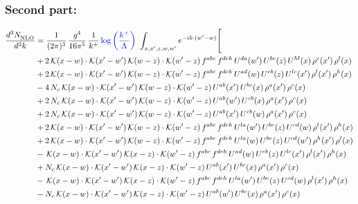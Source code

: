 \documentclass[9pt]{article}
\numberwithin{equation}{section}
\begin{document}
\subsubsection{Second part:}
\begin{align}
\frac{d^{3}N_{\rm NLO}^{\rm}}{d^{3}k}  & = \frac{1}{(2\pi)^{3}}\,\frac{g^{4}}{16\pi^{5}}\,\frac{1}{k^{+}}\,{\color{blue}\log{\left(\frac{k^{+}}{\Lambda}\right)}}\,\,\int_{x,x',z,w,w'}e^{-ik\cdot(w'-w)}\Bigg[\notag\\ &+2\,\mathcal{K}(x-w)\cdot\mathcal{K}(x'-w')\,\mathcal{K}(w-z)\cdot\mathcal{K}(w'-z)\,f^{abc}\,f^{deh}\,U^{da}(w')\,U^{be}(z)\,U^{hl}(x)\,\rho^{c}(x')\,\rho^{l}(x)\notag\\
&+2\,\mathcal{K}(x-w)\cdot\mathcal{K}(x'-w')\,\mathcal{K}(w-z)\cdot\mathcal{K}(w'-z)\,f^{abc}\,f^{deh}\,U^{ad}(w)\,U^{eb}(z)\,U^{lc}(x')\,\rho^{l}(x')\,\rho^{h}(x)\notag\\
&-4\,N_{c}\,\mathcal{K}(x-w)\cdot\mathcal{K}(x'-w')\,\mathcal{K}(w-z)\cdot\mathcal{K}(w'-z)\,U^{ab}(x')\,U^{bc}(x)\,\rho^{a}(x')\,\rho^{c}(x)\notag\\
&+2\,N_{c}\,\mathcal{K}(x-w)\cdot\mathcal{K}(x'-w')\,\mathcal{K}(w-z)\cdot\mathcal{K}(w'-z)\,U^{ab}(w')\,U^{cb}(x)\,\rho^{a}(x')\,\rho^{c}(x)\notag\\
&+2\,N_{c}\,\mathcal{K}(x-w)\cdot\mathcal{K}(x'-w')\,\mathcal{K}(w-z)\cdot\mathcal{K}(w'-z)\,U^{ab}(x')\,U^{cb}(w)\,\rho^{a}(x')\,\rho^{c}(x)\notag\\
&+2\,\mathcal{K}(x-w)\cdot\mathcal{K}(x'-w')\,\mathcal{K}(w-z)\cdot\mathcal{K}(w'-z)\,f^{abc}\,f^{deh}\,U^{la}(w')\,U^{be}(z)\,U^{cd}(w)\,\rho^{l}(x')\,\rho^{h}(x)\notag\\
&+2\,\mathcal{K}(x-w)\cdot\mathcal{K}(x'-w')\,\mathcal{K}(w-z)\cdot\mathcal{K}(w'-z)\,f^{abc}\,f^{deh}\,U^{la}(w)\,U^{be}(z)\,U^{cd}(w')\,\rho^{h}(x')\,\rho^{l}(x)\notag\\
&-\,\mathcal{K}(x-w)\cdot\mathcal{K}(x'-w')\,\mathcal{K}(x-z)\cdot\mathcal{K}(w'-z)\,f^{abc}\,f^{deh}\,U^{ad}(w)\,U^{eb}(z)\,U^{lc}(x')\,\rho^{l}(x')\,\rho^{h}(x)\notag\\
&+N_{c}\,\mathcal{K}(x-w)\cdot\mathcal{K}(x'-w')\,\mathcal{K}(x-z)\cdot\mathcal{K}(w'-z)\,U^{ab}(x')\,U^{bc}(x)\,\rho^{a}(x')\,\rho^{c}(x)\notag\\
&-\,\mathcal{K}(x-w)\cdot\mathcal{K}(x'-w')\,\mathcal{K}(x-z)\cdot\mathcal{K}(w'-z)\,f^{abc}\,f^{deh}\,U^{la}(w')\,U^{be}(z)\,U^{cd}(w)\,\rho^{l}(x')\,\rho^{h}(x)\notag\\
&-N_{c}\,\mathcal{K}(x-w)\cdot\mathcal{K}(x'-w')\,\mathcal{K}(x-z)\cdot\mathcal{K}(w'-z)\,U^{ab}(w')\,U^{bc}(x)\,\rho^{a}(x')\,\rho^{c}(x)\notag\\

\end{align}
\end{document}
